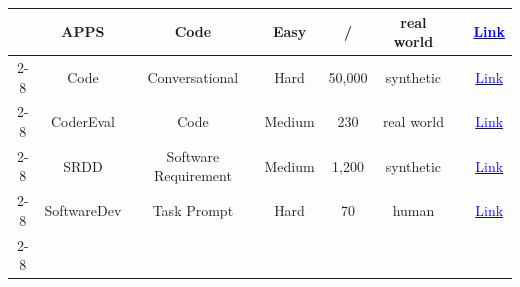 \begin{table}[!htp]
{\begin{tabular}{c|c|c|c|c|c|c|c}
                                                                                  & APPS                   & Code                    & Easy                & /                & real world          & \cite{dong2023self}                                                                                                                                                             & \href{https://github.com/hendrycks/apps}{\textcolor{blue}{Link}}                                                                                                  \\ \cline{2-8}
                                                                                  & Code                   & Conversational          & Hard                & 50,000           & synthetic           & \cite{li2023camel}                                                                                                                                                              & \href{https://huggingface.co/camel-ai}{\textcolor{blue}{Link}}                                                                                                    \\ \cline{2-8}
                                                                                  & CoderEval              & Code                    & Medium              & 230              & real world          & \cite{dong2023self}                                                                                                                                                             & \href{https://github.com/CoderEval/CoderEval}{\textcolor{blue}{Link}}                                                                                             \\ \cline{2-8}
                                                                                  & SRDD                   & Software Requirement    & Medium              & 1,200            & synthetic           & \cite{qian2024chatdev,qian2023experiential,qian2024iterative,yukhymenko2024synthetic}                     & \href{https://github.com/OpenBMB/ChatDev/tree/main/SRDD}{\textcolor{blue}{Link}}                                                                                  \\ \cline{2-8}
                                                                                  & SoftwareDev            & Task Prompt             & Hard                & 70               & human               & \cite{hong2023metagpt}                                                                                                                                                          & \href{https://github.com/geekan/MetaGPT}{\textcolor{blue}{Link}}                                                                                                  \\ \cline{2-8}

\end{tabular}}
\end{table}
